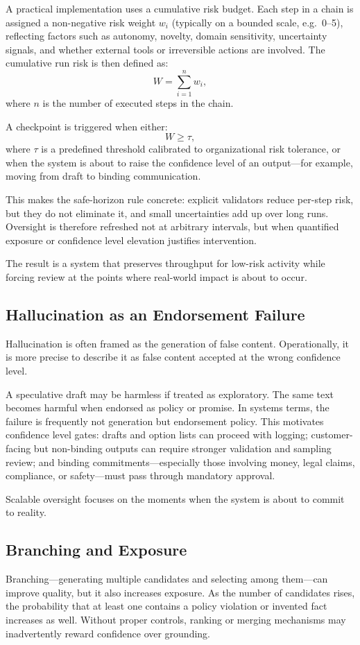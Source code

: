 A practical implementation uses a cumulative risk budget. Each step in a chain is assigned a non-negative risk weight \(w_i\) (typically on a bounded scale, e.g.\ 0--5), reflecting factors such as autonomy, novelty, domain sensitivity, uncertainty signals, and whether external tools or irreversible actions are involved. The cumulative run risk is then defined as:
\[
W = \sum_{i=1}^{n} w_i,
\]
where \(n\) is the number of executed steps in the chain.

A checkpoint is triggered when either:
\[
W \ge \tau,
\]
where \(\tau\) is a predefined threshold calibrated to organizational risk tolerance, or when the system is about to raise the confidence level of an output---for example, moving from draft to binding communication.

This makes the safe-horizon rule concrete: explicit validators reduce per-step risk, but they do not eliminate it, and small uncertainties add up over long runs. Oversight is therefore refreshed not at arbitrary intervals, but when quantified exposure or confidence level elevation justifies intervention.

The result is a system that preserves throughput for low-risk activity while forcing review at the points where real-world impact is about to occur. 

\subsection{Hallucination as an Endorsement Failure}
Hallucination is often framed as the generation of false content. Operationally, it is more precise to describe it as false content accepted at the wrong confidence level.

A speculative draft may be harmless if treated as exploratory. The same text becomes harmful when endorsed as policy or promise. In systems terms, the failure is frequently not generation but endorsement policy. This motivates confidence level gates: drafts and option lists can proceed with logging; customer-facing but non-binding outputs can require stronger validation and sampling review; and binding commitments---especially those involving money, legal claims, compliance, or safety---must pass through mandatory approval.

Scalable oversight focuses on the moments when the system is about to commit to reality. 

\subsection{Branching and Exposure}
Branching---generating multiple candidates and selecting among them---can improve quality, but it also increases exposure. As the number of candidates rises, the probability that at least one contains a policy violation or invented fact increases as well. Without proper controls, ranking or merging mechanisms may inadvertently reward confidence over grounding.

